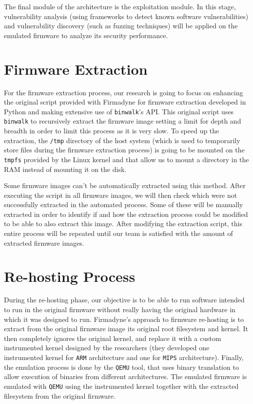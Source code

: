 The final module of the architecture is the exploitation module. In this stage, vulnerability analysis (using frameworks to detect known software vulnerabilities) and vulnerability discovery (such as fuzzing techniques) will be applied on the emulated firmware to analyze its security performance.

\section{Firmware Extraction}
\label{sec:extraction}

For the firmware extraction process, our research is going to focus on enhancing the original script provided with Firmadyne \cite{firmadyne} for firmware extraction developed in Python and making extensive use of {\tt binwalk}'s API. This original script uses {\tt binwalk} to recursively extract the firmware image setting a limit for depth and breadth in order to limit this process as it is very slow. To speed up the extraction, the {\tt /tmp} directory of the host system (which is used to temporarily store files during the firmware extraction process) is going to be mounted on the {\tt tmpfs} provided by the Linux kernel and that allow us to mount a directory in the RAM instead of mounting it on the disk.

Some firmware images can't be automatically extracted using this method. After executing the script in all firmware images, we will then check which were not successfully extracted in the automated process. Some of these will be manually extracted in order to identify if and how the extraction process could be modified to be able to also extract this image. After modifying the extraction script, this entire process will be repeated until our team is satisfied with the amount of extracted firmware images.

\section{Re-hosting Process}
\label{sec:re-hosting}

During the re-hosting phase, our objective is to be able to run software intended to run in the original firmware without really having the original hardware in which it was designed to run. Firmadyne's \cite{firmadyne} approach to firmware re-hosting is to extract from the original firmware image its original root filesystem and kernel. It then completely ignores the original kernel, and replace it with a custom instrumented kernel designed by the researchers (they developed one instrumented kernel for {\tt ARM} architecture and one for {\tt MIPS} architecture). Finally, the emulation process is done by the {\tt QEMU} tool, that uses binary translation to allow execution of binaries from different architectures. The emulated firmware is emulated with {\tt QEMU} using the instrumented kernel together with the extracted filesystem from the original firmware.

